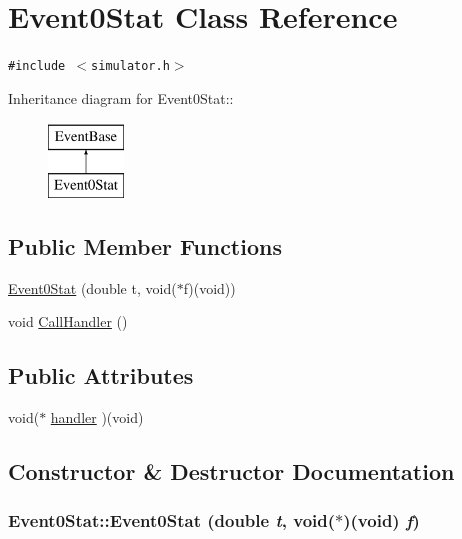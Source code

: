 \hypertarget{classEvent0Stat}{
\section{Event0Stat Class Reference}
\label{classEvent0Stat}
}
{\tt \#include $<$simulator.h$>$}

Inheritance diagram for Event0Stat::\begin{figure}[H]
\begin{center}
\leavevmode
\includegraphics[height=2cm]{classEvent0Stat}
\end{center}
\end{figure}
\subsection*{Public Member Functions}
\begin{CompactItemize}
\item 
\hyperlink{classEvent0Stat_3d17a2a861561140b8d5cfdbfe359af4}{Event0Stat} (double t, void($\ast$f)(void))
\item 
void \hyperlink{classEvent0Stat_0cf3e0d44a1c04ee73a8a93a50ca05a1}{CallHandler} ()
\end{CompactItemize}
\subsection*{Public Attributes}
\begin{CompactItemize}
\item 
void($\ast$ \hyperlink{classEvent0Stat_6638fffbc4b497e2e8368d5e5f057db1}{handler} )(void)
\end{CompactItemize}


\subsection{Constructor \& Destructor Documentation}
\hypertarget{classEvent0Stat_3d17a2a861561140b8d5cfdbfe359af4}{
\subsubsection[{Event0Stat}]{\setlength{\rightskip}{0pt plus 5cm}Event0Stat::Event0Stat (double {\em t}, \/  void($\ast$)(void) {\em f})}}
\label{classEvent0Stat_3d17a2a861561140b8d5cfdbfe359af4}




